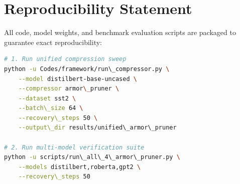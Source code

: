 \section{Reproducibility Statement}
All code, model weights, and benchmark evaluation scripts are packaged to guarantee exact reproducibility:
\begin{lstlisting}[language=bash]
# 1. Run unified compression sweep
python -u Codes/framework/run\_compressor.py \
    --model distilbert-base-uncased \
    --compressor armor\_pruner \
    --dataset sst2 \
    --batch\_size 64 \
    --recovery\_steps 50 \
    --output\_dir results/unified\_armor\_pruner

# 2. Run multi-model verification suite
python -u scripts/run\_all\_4\_armor\_pruner.py \
    --models distilbert,roberta,gpt2 \
    --recovery\_steps 50
\end{lstlisting}
